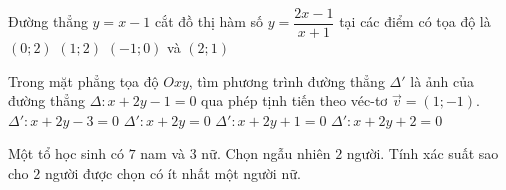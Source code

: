 \begin{ex}%
	Đường thẳng $y=x-1$ cắt đồ thị hàm số $y=\dfrac{2x-1}{x+1}$ tại các điểm có tọa độ là
	{$(0;2)$}
	{$(1;2)$}
	{$(-1;0)$ và $(2;1)$}
\end{ex}

\begin{ex}%
	Trong mặt phẳng tọa độ $Oxy$, tìm phương trình đường thẳng $\Delta '$ là ảnh của đường thẳng $\Delta : x+ 2y-1=0$ qua phép tịnh tiến theo véc-tơ $\vec{v}=(1;-1)$.
	\choice
	{$\Delta ' :x+ 2y-3=0$}
	{\True $\Delta ' :x+ 2y=0$}
	{$\Delta ' :x+ 2y+1=0$}
	{$\Delta ' :x+ 2y+2=0$}
\end{ex}

\begin{ex}%
	Một tổ học sinh có $7$ nam và $3$ nữ. Chọn ngẫu nhiên $2$ người. Tính xác suất sao cho $2$ người được chọn có ít nhất một người nữ.
	\loigiai{
		\[
		\mathrm{P}=\dfrac{\mathrm{C}^1_3\mathrm{C}^1_7+\mathrm{C}^2_3}{\mathrm{C}^2_{10}}	=\dfrac{8}{15}.
		\]	
	}
\end{ex}

